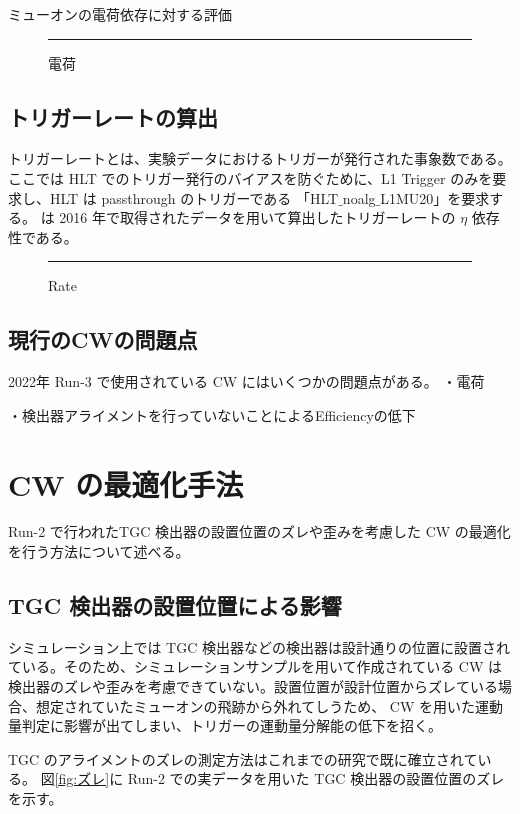 ミューオンの電荷依存に対する評価

\begin{figure}[tb]
  \centering
  \rule{8cm}{6cm}
  \caption{電荷}
  \label{fig:fit_def}
\end{figure}



\subsection{トリガーレートの算出}
トリガーレートとは、実験データにおけるトリガーが発行された事象数である。ここでは HLT でのトリガー発行のバイアスを防ぐために、L1 Trigger のみを要求し、HLT は passthrough のトリガーである 「HLT$\_$noalg$\_$L1MU20」を要求する。 は 2016 年で取得されたデータを用いて算出したトリガーレートの $\eta$ 依存性である。

\begin{figure}[tb]
  \centering
  \rule{8cm}{6cm}
  \caption{Rate}
  \label{fig:Run3_rate}
\end{figure}

\subsection{現行のCWの問題点}
2022年 Run-3 で使用されている CW にはいくつかの問題点がある。
・電荷


・検出器アライメントを行っていないことによるEfficiencyの低下



\section{CW の最適化手法}\label{section:最適化}
Run-2 で行われたTGC 検出器の設置位置のズレや歪みを考慮した CW の最適化を行う方法について述べる。

\subsection{TGC 検出器の設置位置による影響}
シミュレーション上では TGC 検出器などの検出器は設計通りの位置に設置されている。そのため、シミュレーションサンプルを用いて作成されている CW は検出器のズレや歪みを考慮できていない。設置位置が設計位置からズレている場合、想定されていたミューオンの飛跡から外れてしうため、 CW を用いた運動量判定に影響が出てしまい、トリガーの運動量分解能の低下を招く。

TGC のアライメントのズレの測定方法はこれまでの研究で既に確立されている。
図\ref{fig:ズレ}に Run-2 での実データを用いた TGC 検出器の設置位置のズレを示す。

